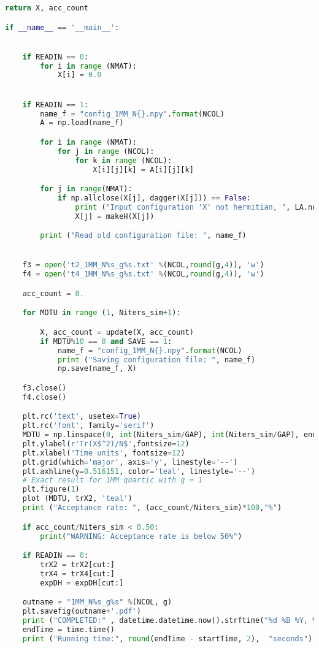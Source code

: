 \begin{lstlisting}[language=Python]
    return X, acc_count

if __name__ == '__main__':


    if READIN == 0:
        for i in range (NMAT): 
            X[i] = 0.0  


    if READIN == 1:
        name_f = "config_1MM_N{}.npy".format(NCOL)
        A = np.load(name_f)

        for i in range (NMAT):
            for j in range (NCOL):
                for k in range (NCOL):
                    X[i][j][k] = A[i][j][k]

        for j in range(NMAT):
            if np.allclose(X[j], dagger(X[j])) == False:
                print ("Input configuration 'X' not hermitian, ", LA.norm(X[j] - dagger(X[j])), "making it so")
                X[j] = makeH(X[j])

        print ("Read old configuration file: ", name_f)


    f3 = open('t2_1MM_N%s_g%s.txt' %(NCOL,round(g,4)), 'w')
    f4 = open('t4_1MM_N%s_g%s.txt' %(NCOL,round(g,4)), 'w')

    acc_count = 0.

    for MDTU in range (1, Niters_sim+1):

        X, acc_count = update(X, acc_count)
        if MDTU%10 == 0 and SAVE == 1:
            name_f = "config_1MM_N{}.npy".format(NCOL)
            print ("Saving configuration file: ", name_f)
            np.save(name_f, X)

    f3.close()
    f4.close()

    plt.rc('text', usetex=True)
    plt.rc('font', family='serif')
    MDTU = np.linspace(0, int(Niters_sim/GAP), int(Niters_sim/GAP), endpoint=True)
    plt.ylabel(r'Tr(X$^2)/N$',fontsize=12)
    plt.xlabel('Time units', fontsize=12)
    plt.grid(which='major', axis='y', linestyle='--')
    plt.axhline(y=0.516151, color='teal', linestyle='--')
    # Exact result for 1MM quartic with g = 1
    plt.figure(1)
    plot (MDTU, trX2, 'teal') 
    print ("Acceptance rate: ", (acc_count/Niters_sim)*100,"%") 

    if acc_count/Niters_sim < 0.50:
        print("WARNING: Acceptance rate is below 50%")

    if READIN == 0:
        trX2 = trX2[cut:]
        trX4 = trX4[cut:]
        expDH = expDH[cut:] 

    outname = "1MM_N%s_g%s" %(NCOL, g)
    plt.savefig(outname+'.pdf')
    print ("COMPLETED:" , datetime.datetime.now().strftime("%d %B %Y, %H:%M:%S"))
    endTime = time.time() 
    print ("Running time:", round(endTime - startTime, 2),  "seconds")
\end{lstlisting}